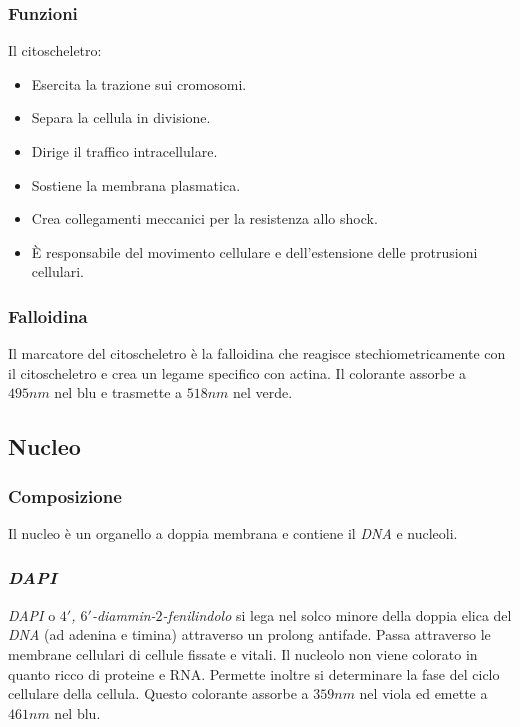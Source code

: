 		\subsubsection{Funzioni}
		Il citoscheletro:
		\begin{multicols}{2}
			\begin{itemize}
				\item Esercita la trazione sui cromosomi.
				\item Separa la cellula in divisione.
				\item Dirige il traffico intracellulare.
				\item Sostiene la membrana plasmatica.
				\item Crea collegamenti meccanici per la resistenza allo shock.
				\item \`E responsabile del movimento cellulare e dell'estensione delle protrusioni cellulari.
			\end{itemize}
		\end{multicols}

		\subsubsection{Falloidina}
		Il marcatore del citoscheletro \`e la falloidina che reagisce stechiometricamente con il citoscheletro e crea un legame specifico con actina.
		Il colorante assorbe a $495\si{nm}$ nel blu e trasmette a $518\si{nm}$ nel verde.
		
	\subsection{Nucleo}

		\subsubsection{Composizione}
		Il nucleo \`e un organello a doppia membrana e contiene il \emph{DNA} e nucleoli.

		\subsubsection{\emph{DAPI}}
		\emph{DAPI} o \emph{$4'$, $6'$-diammin-$2$-fenilindolo} si lega nel solco minore della doppia elica del \emph{DNA} (ad adenina e timina) attraverso un prolong antifade.
		Passa attraverso le membrane cellulari di cellule fissate e vitali.
		Il nucleolo non viene colorato in quanto ricco di proteine e RNA.
		Permette inoltre si determinare la fase del ciclo cellulare della cellula.
		Questo colorante assorbe a $359\si{nm}$ nel viola ed emette a $461\si{nm}$ nel blu.

